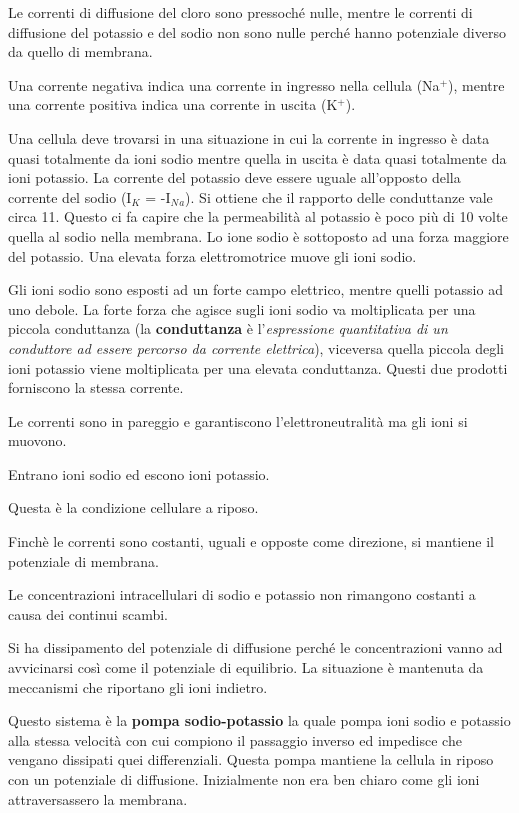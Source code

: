 \documentclass[]{article}
\begin{document}
Le correnti di diffusione del cloro sono pressoché nulle, mentre le
correnti di diffusione del potassio e del sodio non sono nulle perché
hanno potenziale diverso da quello di membrana.

Una corrente negativa indica una corrente in ingresso nella cellula
(Na\(^+\)), mentre una corrente positiva indica una corrente in uscita
(K\(^+\)).

Una cellula deve trovarsi in una situazione in cui la corrente in
ingresso è data quasi totalmente da ioni sodio mentre quella in uscita è
data quasi totalmente da ioni potassio. La corrente del potassio deve
essere uguale all'opposto della corrente del sodio (I\(_K\) =
-I\(_N\)\(_a\)). Si ottiene che il rapporto delle conduttanze vale circa
11. Questo ci fa capire che la permeabilità al potassio è poco più di 10
volte quella al sodio nella membrana. Lo ione sodio è sottoposto ad una
forza maggiore del potassio. Una elevata forza elettromotrice muove gli
ioni sodio.

Gli ioni sodio sono esposti ad un forte campo elettrico, mentre quelli
potassio ad uno debole. La forte forza che agisce sugli ioni sodio va
moltiplicata per una piccola conduttanza (la \textbf{conduttanza} è
l'\emph{espressione quantitativa di un conduttore ad essere percorso da
corrente elettrica}), viceversa quella piccola degli ioni potassio viene
moltiplicata per una elevata conduttanza. Questi due prodotti forniscono
la stessa corrente.

Le correnti sono in pareggio e garantiscono l'elettroneutralità ma gli
ioni si muovono.

Entrano ioni sodio ed escono ioni potassio.

Questa è la condizione cellulare a riposo.

Finchè le correnti sono costanti, uguali e opposte come direzione, si
mantiene il potenziale di membrana.

Le concentrazioni intracellulari di sodio e potassio non rimangono
costanti a causa dei continui scambi.

Si ha dissipamento del potenziale di diffusione perché le concentrazioni
vanno ad avvicinarsi così come il potenziale di equilibrio. La
situazione è mantenuta da meccanismi che riportano gli ioni indietro.

Questo sistema è la \textbf{pompa sodio-potassio} la quale pompa ioni
sodio e potassio alla stessa velocità con cui compiono il passaggio
inverso ed impedisce che vengano dissipati quei differenziali. Questa
pompa mantiene la cellula in riposo con un potenziale di diffusione.
Inizialmente non era ben chiaro come gli ioni attraversassero la
membrana.
\end{document}
